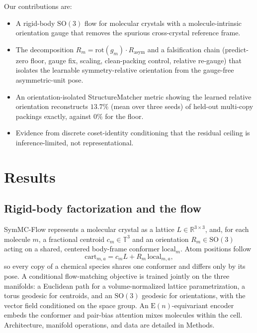 \documentclass[11pt]{article}
\begin{document}
Our contributions are:
\begin{itemize}
\itemsep0.1em
\item A rigid-body $\mathrm{SO}(3)$ flow for molecular crystals with a
molecule-intrinsic orientation gauge that removes the spurious cross-crystal
reference frame.
\item The decomposition $R_m = \mathrm{rot}(g_m)\cdot R_{\text{asym}}$ and a
falsification chain (predict-zero floor, gauge fix, scaling, clean-packing
control, relative re-gauge) that isolates the learnable symmetry-relative
orientation from the gauge-free asymmetric-unit pose.
\item An orientation-isolated StructureMatcher metric showing the learned
relative orientation reconstructs $13.7\%$ (mean over three seeds) of held-out
multi-copy packings exactly, against $0\%$ for the floor.
\item Evidence from discrete coset-identity conditioning that the residual
ceiling is inference-limited, not representational.
\end{itemize}

\section{Results}

\subsection{Rigid-body factorization and the flow}

SymMC-Flow represents a molecular crystal as a lattice $L\in\mathbb{R}^{3\times3}$,
and, for each molecule $m$, a fractional centroid $c_m\in\mathbb{T}^3$ and an
orientation $R_m\in\mathrm{SO}(3)$ acting on a shared, centered body-frame
conformer $\text{local}_m$. Atom positions follow
\begin{equation}
\text{cart}_{m,a} = c_m L + R_m\,\text{local}_{m,a},
\label{eq:factor}
\end{equation}
so every copy of a chemical species shares one conformer and differs only by its
pose. A conditional flow-matching objective\cite{lipman2023flowmatching} is
trained jointly on the three manifolds: a Euclidean path for a
volume-normalized lattice parametrization, a torus geodesic for centroids, and
an $\mathrm{SO}(3)$ geodesic for orientations, with the vector field conditioned
on the space group. An $\mathrm{E}(n)$-equivariant
encoder\cite{satorras2021egnn} embeds the conformer and pair-bias attention
mixes molecules within the cell. Architecture, manifold operations, and data
are detailed in Methods.
\end{document}
